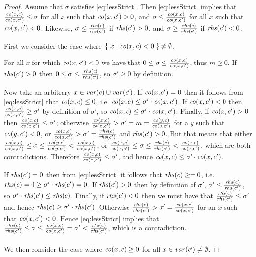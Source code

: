 \lessStrict*
\begin{proof}
Assume that $\sigma$ satisfies \eqref{eq:lessStrict}. Then \eqref{eq:lessStrict} implies that  
$\frac{\mathit{co}(x,c)}{\mathit{co}(x,c')}\leq \sigma$ for all $x$ such that $\mathit{co}(x,c')>0$, and $\sigma \leq \frac{\mathit{co}(x,c)}{\mathit{co}(x,c')}$ for all $x$ such that $\mathit{co}(x,c')<0$. 
Likewise, $\sigma\leq \frac{\mathit{rhs}(c)}{\mathit{rhs}(c')}$ if $\mathit{rhs}(c')>0$, and $\sigma\geq \frac{\mathit{rhs}(c)}{\mathit{rhs}(c')}$ if $\mathit{rhs}(c')<0$. 

First we consider the case where $\{\;{x}\;|\;{\mathit{co}(x,c)<0}\;\}\neq \emptyset$.

For all $x$ for which $\mathit{co}(x,c')<0$ we have that $0\leq \sigma\leq \frac{\mathit{co}(x,c)}{\mathit{co}(x,c')}$, thus $m\geq 0$. If $\mathit{rhs}(c')>0$ then $0\leq \sigma\leq \frac{\mathit{rhs}(c)}{\mathit{rhs}(c')}$, so $\sigma'\geq 0$ by definition.

Now take an arbitrary $x\in\mathit{var}(c)\cup\mathit{var}(c')$. 
If $\mathit{co}(x,c') = 0$ then it follows from \eqref{eq:lessStrict} that $\mathit{co}(x,c)\leq 0$, i.e. $\mathit{co}(x,c) \leq \sigma'\cdot \mathit{co}(x,c')$. 	
If $\mathit{co}(x,c') < 0$ then $\frac{\mathit{co}(x,c)}{\mathit{co}(x,c')}\geq \sigma'$ by definition of $\sigma'$, so $\mathit{co}(x,c)\leq \sigma'\cdot \mathit{co}(x,c')$. 
Finally, if $\mathit{co}(x,c') > 0$ then $\frac{\mathit{co}(x,c)}{\mathit{co}(x,c')}\leq \sigma'$; otherwise $\frac{\mathit{co}(x,c)}{\mathit{co}(x,c')}> \sigma' = m = \frac{\mathit{co}(y,c)}{\mathit{co}(y,c')}$ for a $y$ such that $\mathit{co}(y,c')<0$, or $\frac{\mathit{co}(x,c)}{\mathit{co}(x,c')}> \sigma' =\frac{\mathit{rhs}(c)}{\mathit{rhs}(c')}$ and $\mathit{rhs}(c')>0$. But that means that either $\frac{\mathit{co}(x,c)}{\mathit{co}(x,c')}\leq \sigma\leq \frac{\mathit{co}(y,c)}{\mathit{co}(y,c')}<\frac{\mathit{co}(x,c)}{\mathit{co}(x,c')}$, or $\frac{\mathit{co}(x,c)}{\mathit{co}(x,c')}\leq \sigma\leq \frac{\mathit{rhs}(c)}{\mathit{rhs}(c')}<\frac{\mathit{co}(x,c)}{\mathit{co}(x,c')}$, which are both contradictions. 
Therefore $\frac{\mathit{co}(x,c)}{\mathit{co}(x,c')}\leq \sigma'$, and hence $\mathit{co}(x,c)\leq \sigma'\cdot \mathit{co}(x,c')$.  

If $\mathit{rhs}(c')=0$ then from \eqref{eq:lessStrict} it follows that $\mathit{rhs}(c) \geq = 0$, i.e. $\mathit{rhs}(c)=0 \geq \sigma'\cdot \mathit{rhs}(c') = 0$.   
If $\mathit{rhs}(c')> 0$ then by definition of $\sigma'$, $\sigma'\leq\frac{\mathit{rhs}(c)}{\mathit{rhs}(c')}$, so $\sigma'\cdot \mathit{rhs}(c') \leq \mathit{rhs}(c)$.
Finally, if $\mathit{rhs}(c')< 0$ then we must have that $\frac{\mathit{rhs}(c)}{\mathit{rhs}(c')}\leq \sigma'$ and hence $\mathit{rhs}(c) \geq \sigma'\cdot \mathit{rhs}(c')$. Otherwise $\frac{\mathit{rhs}(c)}{\mathit{rhs}(c')} > \sigma' = \frac{\mathit{co}(x,c)}{\mathit{co}(x,c')}$ for an $x$ such that $\mathit{co}(x,c')<0$. Hence \eqref{eq:lessStrict} implies that $\frac{\mathit{rhs}(c)}{\mathit{rhs}(c')} \leq \sigma \leq \frac{\mathit{co}(x,c)}{\mathit{co}(x, c')} = \sigma' < \frac{\mathit{rhs}(c)}{\mathit{rhs}(c')}$, which is a contradiction. 
\\\\
We then consider the case where $\mathit{co}(x,c)\geq 0$ for all $x\in \mathit{var}(c')\neq \emptyset$.


\end{proof}
